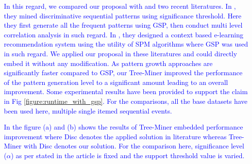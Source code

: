 \textcolor{blue}{In this regard, we compared our proposal with \cite{he2019significance} and \cite{tarus2018hybrid} two recent literatures. In \cite{he2019significance}, they mined discriminative sequential patterns using significance threshold. Here they first generate all the frequent patterns using GSP, then conduct multi level correlation analysis in such regard. In \cite{tarus2018hybrid}, they designed a context based e-learning recommendation system using the utility of SPM algorithms where GSP was used in such regard. We applied our proposal in these literatures and could directly embed it without any modification. As pattern growth approaches are significantly faster compared to GSP, our Tree-Miner improved the performance of the pattern generation level to a significant amount leading to an overall improvement. Some experimental results have been provided to support the claim in Fig \ref{figure:runtime_with_gsp}. For the comparisons, all the base datasets have been used here, multiple single itemed  sequential events.} 

\textcolor{blue}{In the figure (a) and (b) shows the results of Tree-Miner embedded performance improvement where Disc denotes the applied solution in literature \cite{he2019significance} whereas Tree-Miner with Disc denotes our solution. For the comparison here, significance level ($\alpha$) as per stated in the article is fixed and the support threshold value is varied.}

